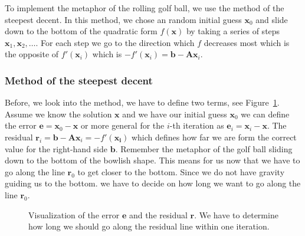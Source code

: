 To implement the metaphor of the rolling golf ball, we use the method of the steepest decent. In this method, we chose an random initial guess $\mathbf{x}_0$ and slide down to the bottom of the quadratic form $f(\mathbf{x})$ by taking a series of steps $\mathbf{x}_1,\mathbf{x}_2,\ldots$. For each step we go to the direction which $f$ decreases most which is the opposite of $f'(\mathbf{x}_i)$ which is $-f'(\mathbf{x}_i)= \mathbf{b}-\mathbf{A}\mathbf{x}_i$.

\subsubsection{Method of the steepest decent}
Before, we look into the method, we have to define two terms, see Figure~\ref{fig:skecth:error:residual}. Assume we know the solution $\mathbf{x}$ and we have our initial guess $\mathbf{x}_0$ we can define the error $\mathbf{e} = \mathbf{x}_0 - \mathbf{x}$ or more general for the $i$-th iteration as  $\mathbf{e}_i = \mathbf{x}_i - \mathbf{x}$. The residual $\mathbf{r}_i = \mathbf{b}-\mathbf{A}\mathbf{x}_i=-f'(\mathbf{x_i})$ which defines how far we are form the correct value for the right-hand side $\mathbf{b}$. Remember the metaphor of the golf ball sliding down to the bottom of the bowlish shape. This means for us now that we have to go along the line $\mathbf{r}_0$ to get closer to the bottom. Since we do not have gravity guiding us to the bottom. we have to decide on how long we want to go along the line $\mathbf{r}_0$.\\

\begin{figure}[tb]
\centering
{}
\caption{Visualization of the error $\mathbf{e}$ and the residual $\mathbf{r}$. We have to determine how long we should go along the residual line within one iteration. }
\label{fig:skecth:error:residual}
\end{figure}

